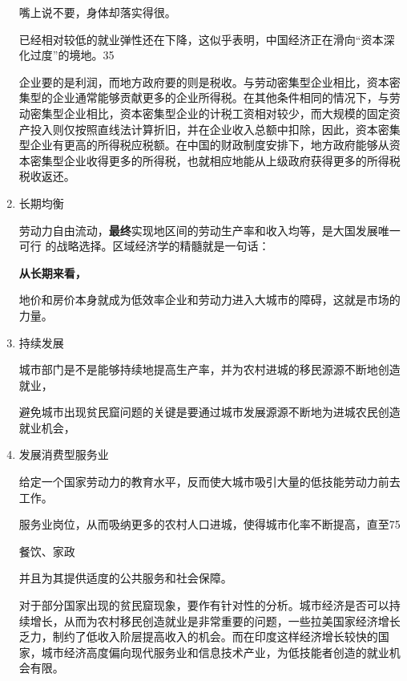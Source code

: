 \begin{enumerate}
  嘴上说不要，身体却落实得很。


  已经相对较低的就业弹性还在下降，这似乎表明，中国经济正在滑向“资本深化过度”的境地。35

企业要的是利润，而地方政府要的则是税收。与劳动密集型企业相比，资本密集型的企业通常能够贡献更多的企业所得税。在其他条件相同的情况下，与劳动密集型企业相比，资本密集型企业的计税工资相对较少，而大规模的固定资产投入则仅按照直线法计算折旧，并在企业收入总额中扣除，因此，资本密集型企业有更高的所得税应税额。在中国的财政制度安排下，地方政府能够从资本密集型企业收得更多的所得税，也就相应地能从上级政府获得更多的所得税税收返还。

\item 长期均衡


  劳动力自由流动，\textbf{最终}实现地区间的劳动生产率和收入均等，是大国发展唯一可行
  的战略选择。区域经济学的精髓就是一句话：

  \textbf{从长期来看，}

地价和房价本身就成为低效率企业和劳动力进入大城市的障碍，这就是市场的力量。

\item 持续发展


城市部门是不是能够持续地提高生产率，并为农村进城的移民源源不断地创造就业，


避免城市出现贫民窟问题的关键是要通过城市发展源源不断地为进城农民创造就业机会，

\item 发展消费型服务业

给定一个国家劳动力的教育水平，反而使大城市吸引大量的低技能劳动力前去工作。


服务业岗位，从而吸纳更多的农村人口进城，使得城市化率不断提高，直至75%

餐饮、家政


并且为其提供适度的公共服务和社会保障。

对于部分国家出现的贫民窟现象，要作有针对性的分析。城市经济是否可以持续增长，从而为农村移民创造就业是非常重要的问题，一些拉美国家经济增长乏力，制约了低收入阶层提高收入的机会。而在印度这样经济增长较快的国家，城市经济高度偏向现代服务业和信息技术产业，为低技能者创造的就业机会有限。

\end{enumerate}



